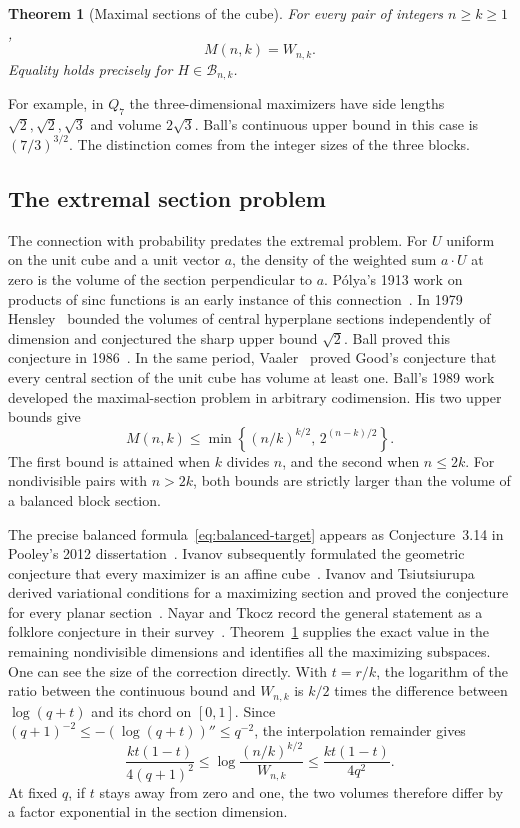 \documentclass[11pt,a4paper]{article}
\newtheorem{theorem}{Theorem}[section]
\theoremstyle{remark}\newtheorem{remark}[theorem]{Remark}
\numberwithin{equation}{section}
\begin{document}
\begin{theorem}[Maximal sections of the cube]\label{thm:full-balanced-value}
For every pair of integers $n\ge k\ge1$,
\[
 M(n,k)=W_{n,k}.
\]
Equality holds precisely for $H\in\mathcal B_{n,k}$.
\end{theorem}

For example, in \(Q_7\) the three-dimensional maximizers have side
lengths \(\sqrt2,\sqrt2,\sqrt3\) and volume \(2\sqrt3\). Ball's
continuous upper bound in this case is \((7/3)^{3/2}\).
The distinction comes from the integer sizes of the three blocks.

\subsection{The extremal section problem}

The connection with probability predates the extremal problem.
For \(U\) uniform on the unit cube and a unit vector \(a\), the
density of the weighted sum \(a\cdot U\) at zero is the volume of
the section perpendicular to \(a\). P\'olya's
1913 work on products of sinc functions is an early instance of this
connection~\cite{Polya1913,NayarTkocz2023}.
In 1979 Hensley~\cite{Hensley1979} bounded the volumes of central hyperplane
sections independently of dimension and conjectured the sharp upper
bound $\sqrt2$. Ball proved this conjecture in
1986~\cite{Ball1986}. In the same period, Vaaler~\cite{Vaaler1979}
proved Good's conjecture that every central section of the unit cube
has volume at least one.
Ball's 1989 work~\cite{Ball1989} developed the maximal-section problem
in arbitrary codimension. His two upper bounds give
\[
 M(n,k)\le
 \min\left\{(n/k)^{k/2},\,2^{(n-k)/2}\right\}.
\]
The first bound is attained when \(k\) divides \(n\), and the second
when \(n\le2k\). For nondivisible pairs with \(n>2k\), both bounds are
strictly larger than the volume of a balanced block section.

The precise balanced formula~\eqref{eq:balanced-target} appears as
Conjecture~3.14 in Pooley's 2012 dissertation~\cite{Pooley2012}.
Ivanov subsequently formulated the geometric conjecture that every
maximizer is an affine cube~\cite{Ivanov2021Cross}. Ivanov and
Tsiutsiurupa derived variational conditions for a maximizing section
and proved the conjecture for every planar section~\cite{IvanovTsiutsiurupa2021}. Nayar and Tkocz record the general
statement as a folklore conjecture in their
survey~\cite[Conjecture~1]{NayarTkocz2023}.
Theorem~\ref{thm:full-balanced-value} supplies the exact value in
the remaining nondivisible dimensions and identifies all the maximizing
subspaces. One can see the size of the correction directly. With
\(t=r/k\), the logarithm of the ratio between the continuous bound and
\(W_{n,k}\) is \(k/2\) times the difference between \(\log(q+t)\) and its
chord on \([0,1]\). Since \((q+1)^{-2}\le-(\log(q+t))''\le q^{-2}\),
the interpolation remainder gives
\[
 \frac{kt(1-t)}{4(q+1)^2}\le
 \log\frac{(n/k)^{k/2}}{W_{n,k}}
 \le\frac{kt(1-t)}{4q^2}.
\]
At fixed \(q\), if \(t\) stays away from zero and one, the two volumes
therefore differ by a factor exponential in the section dimension.
\end{document}
